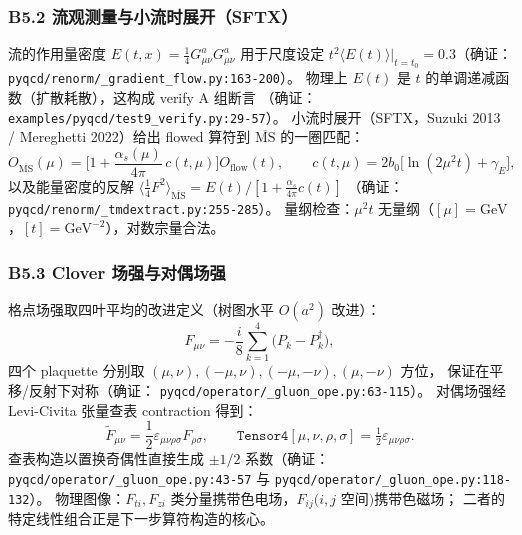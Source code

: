 \documentclass[UTF8]{ctexart}
\begin{document}
\subsubsection{B5.2 流观测量与小流时展开（SFTX）}
流的作用量密度 $E(t,x)=\frac14 G^a_{\mu\nu}G^a_{\mu\nu}$ 用于尺度设定
$t^2\langle E(t)\rangle|_{t=t_0}=0.3$（确证：
\texttt{\nolinkurl{pyqcd/renorm/_gradient_flow.py:163-200}}）。
物理上 $E(t)$ 是 $t$ 的单调递减函数（扩散耗散），这构成 verify A 组断言
（确证：\texttt{\nolinkurl{examples/pyqcd/test9_verify.py:29-57}}）。
小流时展开（SFTX，Suzuki 2013 / Mereghetti 2022）给出 flowed 算符到
$\overline{\mathrm{MS}}$ 的一圈匹配：
\begin{equation}
O_{\overline{\mathrm{MS}}}(\mu)=\Big[1+\frac{\alpha_s(\mu)}{4\pi}\,c(t,\mu)\Big]O_{\mathrm{flow}}(t),\qquad
c(t,\mu)=2b_0\big[\ln(2\mu^2 t)+\gamma_E\big],
\label{eq:sftx}
\end{equation}
以及能量密度的反解 $\langle\tfrac14 F^2\rangle_{\overline{\mathrm{MS}}}
=E(t)/[1+\frac{\alpha_s}{4\pi}c(t)]$
（确证：\texttt{\nolinkurl{pyqcd/renorm/_tmdextract.py:255-285}}）。
量纲检查：$\mu^2 t$ 无量纲（$[\mu]=\mathrm{GeV}$，$[t]=\mathrm{GeV}^{-2}$），对数宗量合法。

\subsubsection{B5.3 Clover 场强与对偶场强}
格点场强取四叶平均的改进定义（树图水平 $O(a^2)$ 改进）：
\begin{equation}
F_{\mu\nu}=-\frac{i}{8}\sum_{k=1}^{4}\big(P_k-P_k^\dagger\big),
\label{eq:clover}
\end{equation}
四个 plaquette 分别取 $(\mu,\nu),(-\mu,\nu),(-\mu,-\nu),(\mu,-\nu)$ 方位，
保证在平移/反射下对称（确证：
\texttt{\nolinkurl{pyqcd/operator/_gluon_ope.py:63-115}}）。
对偶场强经 Levi-Civita 张量查表 contraction 得到：
\begin{equation}
\tilde F_{\mu\nu}=\frac12\varepsilon_{\mu\nu\rho\sigma}F_{\rho\sigma},
\qquad
\texttt{Tensor4}[\mu,\nu,\rho,\sigma]=\tfrac12\varepsilon_{\mu\nu\rho\sigma}.
\label{eq:dual}
\end{equation}
查表构造以置换奇偶性直接生成 $\pm1/2$ 系数（确证：
\texttt{\nolinkurl{pyqcd/operator/_gluon_ope.py:43-57}} 与
\texttt{\nolinkurl{pyqcd/operator/_gluon_ope.py:118-132}}）。
物理图像：$F_{ti},F_{zi}$ 类分量携带色电场，$F_{ij}(i,j$ 空间$)$携带色磁场；
二者的特定线性组合正是下一步算符构造的核心。
\end{document}
